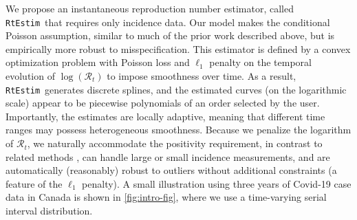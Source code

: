 \documentclass[10pt,letterpaper]{article}
\def\RtEstim{\texttt{RtEstim}}
\def\calR{\mathcal{R}}
\begin{document}
We propose an instantaneous reproduction number estimator, called \RtEstim\ that
requires only incidence data. Our model makes the conditional Poisson
assumption, similar to much of the prior work described above, but is
empirically more robust to misspecification. This estimator is defined by a
convex optimization problem with Poisson loss and $\ell_1$ penalty on the
temporal evolution of $\log(\calR_t)$ to impose smoothness over time. As a
result, \RtEstim\ generates discrete splines, and the estimated curves (on the
logarithmic scale) appear to be piecewise polynomials of an order selected by
the user. Importantly, the estimates are locally adaptive, meaning that
different time ranges may possess heterogeneous smoothness. Because we penalize
the logarithm of $\calR_t$, we naturally accommodate the positivity requirement,
in contrast to related methods \cite{abry2020spatial,pascal2022nonsmooth}, can
handle large or small incidence measurements, and are automatically (reasonably)
robust to outliers without additional constraints (a feature of the $\ell_1$
penalty). A small illustration using three years of Covid-19 case data in Canada
\cite{CovidTimelineCanada} is shown in \autoref{fig:intro-fig}, where we
use a time-varying serial interval distribution. 
\end{document}
